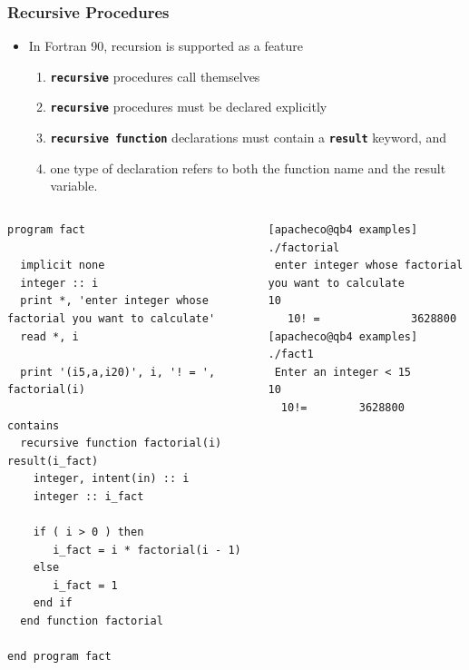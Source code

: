 \documentclass[slidestop,mathserif,compress,xcolor=svgnames]{beamer}
\newenvironment{eblock}[0]
{
\begin{beamerboxesrounded}[upper=uppercol2,lower=lowercol2,shadow=true]}
{\end{beamerboxesrounded}}
\newenvironment{beblock}[0]
{
\begin{beamerboxesrounded}[upper=uppercol3,lower=lowercol3,shadow=true]}
{\end{beamerboxesrounded}}
\begin{document}
\begin{frame}[fragile]
  \frametitle{\small Recursive Procedures}
  \begin{itemize}
    \item In Fortran 90, recursion is supported as a feature
    \begin{enumerate}
      \item \textbf{\texttt{recursive}} procedures call themselves
      \item \textbf{\texttt{recursive}} procedures must be declared explicitly
      \item \textbf{\texttt{recursive function}} declarations must contain a \textbf{\texttt{result}} keyword, and 
      \item one type of declaration refers to both the function name and the result variable.
    \end{enumerate}
  \end{itemize}    
  {\fontsize{4}{5}
    \begin{columns}
      \column{6cm}
      \begin{eblock}{}
        \begin{verbatim}
program fact

  implicit none
  integer :: i
  print *, 'enter integer whose factorial you want to calculate'
  read *, i

  print '(i5,a,i20)', i, '! = ', factorial(i)

contains
  recursive function factorial(i) result(i_fact)
    integer, intent(in) :: i
    integer :: i_fact

    if ( i > 0 ) then
       i_fact = i * factorial(i - 1)
    else
       i_fact = 1
    end if
  end function factorial

end program fact
        \end{verbatim}
      \end{eblock}
      \column{5cm}
      \begin{beblock}{}
        \begin{verbatim}
[apacheco@qb4 examples] ./factorial
 enter integer whose factorial you want to calculate
10 
   10! =              3628800
[apacheco@qb4 examples] ./fact1
 Enter an integer < 15
10
  10!=        3628800
        \end{verbatim}
      \end{beblock}
    \end{columns}
  }
\end{frame}
\end{document}
